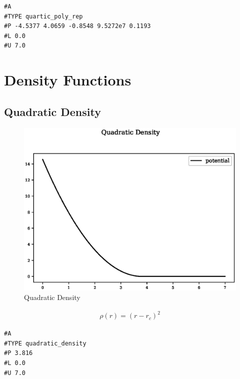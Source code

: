 \begin{lstlisting}[style=sPseudo,caption={Quartic Polynomial with Repulsive Term}]
#A
#TYPE quartic_poly_rep
#P -4.5377 4.0659 -0.8548 9.5272e7 0.1193
#L 0.0
#U 7.0
\end{lstlisting}







\clearpage
\FloatBarrier
\section{Density Functions}

\FloatBarrier
\subsection{Quadratic Density}

\begin{figure}[h]
  \begin{center}
    \includegraphics[width=120mm]{appendix/functions/plots/quadratic_density.eps}
    \caption{Quadratic Density}
    \label{graph:QuadraticDensity}
  \end{center}
\end{figure}

\begin{equation}
\begin{split}
\rho(r) = (r - r_c)^2 
\end{split}
\label{eq:quadraticDensity}
\end{equation}

\begin{lstlisting}[style=sPseudo,caption={Quadratic Density}]
#A
#TYPE quadratic_density
#P 3.816
#L 0.0
#U 7.0
\end{lstlisting}


